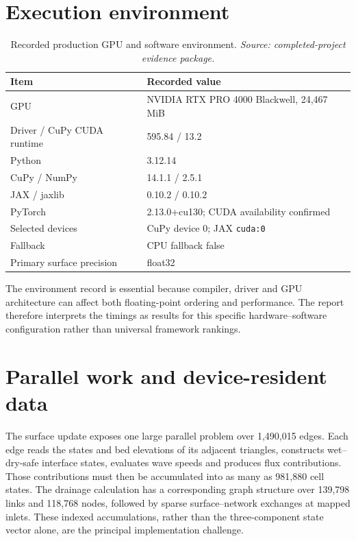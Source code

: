 \documentclass[11pt,a4paper,oneside]{report}
\newcommand{\projectsource}{\textit{Source: completed-project evidence package.}}
\begin{document}
\section{Execution environment}
\begin{table}[H]
\centering
\caption[Production GPU and software environment.]{Recorded production GPU and software
environment. \projectsource}
\label{tab:env}
\small
\begin{tabularx}{0.92\textwidth}{|l|X|}
\hline
\textbf{Item} & \textbf{Recorded value} \\
\hline\hline
GPU & NVIDIA RTX PRO 4000 Blackwell, 24,467 MiB \\ \hdashline[0.4pt/1.2pt]
Driver / CuPy CUDA runtime & 595.84 / 13.2 \\ \hdashline[0.4pt/1.2pt]
Python & 3.12.14 \\ \hdashline[0.4pt/1.2pt]
CuPy / NumPy & 14.1.1 / 2.5.1 \\ \hdashline[0.4pt/1.2pt]
JAX / jaxlib & 0.10.2 / 0.10.2 \\ \hdashline[0.4pt/1.2pt]
PyTorch & 2.13.0+cu130; CUDA availability confirmed \\ \hdashline[0.4pt/1.2pt]
Selected devices & CuPy device 0; JAX \texttt{cuda:0} \\ \hdashline[0.4pt/1.2pt]
Fallback & CPU fallback false \\ \hdashline[0.4pt/1.2pt]
Primary surface precision & float32 \\
\hline
\end{tabularx}
\end{table}

The environment record is essential because compiler, driver and GPU architecture can
affect both floating-point ordering and performance. The report therefore interprets the
timings as results for this specific hardware--software configuration rather than universal
framework rankings.

\section{Parallel work and device-resident data}
The surface update exposes one large parallel problem over 1,490,015 edges. Each edge reads
the states and bed elevations of its adjacent triangles, constructs wet--dry-safe interface
states, evaluates wave speeds and produces flux contributions. Those contributions must
then be accumulated into as many as 981,880 cell states. The drainage calculation has a
corresponding graph structure over 139,798 links and 118,768 nodes, followed by sparse
surface--network exchanges at mapped inlets. These indexed accumulations, rather than the
three-component state vector alone, are the principal implementation challenge.
\end{document}
